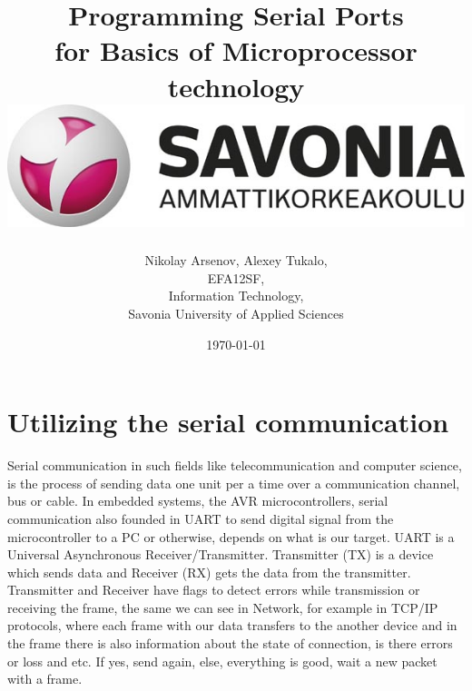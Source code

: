 \documentclass[english]{article}
\date{}
\begin{document}
\title{\vspace{2in}Programming Serial Ports\\
\small for Basics of Microprocessor technology\\
\vspace{0.5in}\includegraphics{savonia.jpg}}

\nopagebreak
\maketitle


\vspace{3in}

\author{
\begin{flushright}
Nikolay Arsenov, Alexey Tukalo,\\
EFA12SF,\\
Information Technology,\\
Savonia University of Applied Sciences
\end{flushright}
}

\date{\today}
\thispagestyle{empty}

\newpage
\setcounter{page}{1}
\setcounter{tocdepth}{2}
\tableofcontents

\newpage


\section{Utilizing the serial communication}
Serial communication in such fields like telecommunication and computer science, is the process of sending data one unit per a time over a communication channel, bus or cable. In embedded systems, the AVR microcontrollers, serial communication also founded in UART to send digital signal from the microcontroller to a PC or otherwise, depends on what is our target. UART is a Universal Asynchronous Receiver/Transmitter. Transmitter (TX) is a device which sends data and Receiver (RX) gets the data from the transmitter. Transmitter and Receiver have flags to detect errors while transmission or receiving the frame, the same we can see in Network, for example in TCP/IP protocols, where each frame with our data transfers to the another device and in the frame there is also information about the state of connection, is there errors or loss and etc. If yes, send again, else, everything is good, wait a new packet with a frame.
\end{document}
